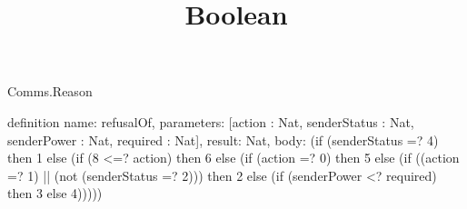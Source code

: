 \begin{lexlean}{Comms.Reason}
\title{Boolean}
\begin{semanticmodule}
definition{
  name: refusalOf,
  parameters: [action : Nat, senderStatus : Nat, senderPower : Nat, required : Nat],
  result: Nat,
  body: (if (senderStatus =? 4) then 1 else (if (8 <=? action) then 6 else (if (action =? 0) then 5 else (if ((action =? 1) || (not (senderStatus =? 2))) then 2 else (if (senderPower <? required) then 3 else 4)))))
}
\end{semanticmodule}
\end{lexlean}
